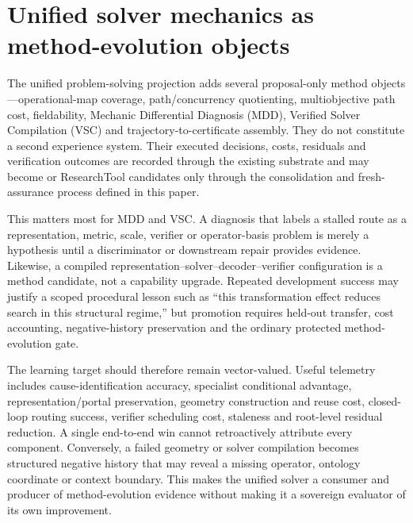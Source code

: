 \section{Unified solver mechanics as method-evolution objects}
\label{sec:unified_solver_learning}

The unified problem-solving projection adds several proposal-only method objects---operational-map coverage, path/concurrency quotienting, multiobjective path cost, fieldability, Mechanic Differential Diagnosis (MDD), Verified Solver Compilation (VSC) and trajectory-to-certificate assembly. They do not constitute a second experience system. Their executed decisions, costs, residuals and verification outcomes are recorded through the existing \TaskEpisode{} substrate and may become \Lesson{} or ResearchTool candidates only through the consolidation and fresh-assurance process defined in this paper.

This matters most for MDD and VSC. A diagnosis that labels a stalled route as a representation, metric, scale, verifier or operator-basis problem is merely a hypothesis until a discriminator or downstream repair provides evidence. Likewise, a compiled representation--solver--decoder--verifier configuration is a method candidate, not a capability upgrade. Repeated development success may justify a scoped procedural lesson such as ``this transformation effect reduces search in this structural regime,'' but promotion requires held-out transfer, cost accounting, negative-history preservation and the ordinary protected method-evolution gate.

The learning target should therefore remain vector-valued. Useful telemetry includes cause-identification accuracy, specialist conditional advantage, representation/portal preservation, geometry construction and reuse cost, closed-loop routing success, verifier scheduling cost, staleness and root-level residual reduction. A single end-to-end win cannot retroactively attribute every component. Conversely, a failed geometry or solver compilation becomes structured negative history that may reveal a missing operator, ontology coordinate or context boundary. This makes the unified solver a consumer and producer of method-evolution evidence without making it a sovereign evaluator of its own improvement.
